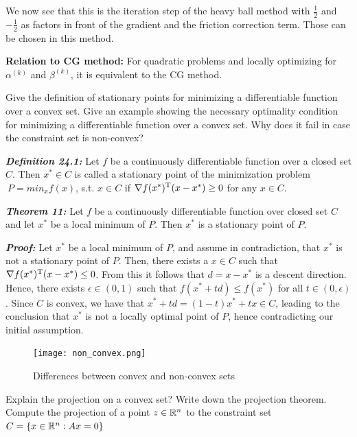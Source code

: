 \documentclass[12pt,a4paper]{article}
\begin{document}
We now see that this is the iteration step of the heavy ball method with $\frac{1}{2}$ and $-\frac{1}{2}$ as factors in front of the gradient and the friction correction term. Those can be chosen in this method.

\textbf{Relation to CG method:} For quadratic problems and locally optimizing for $\alpha^{(k)}$ and $\beta^{(k)}$, it is equivalent to the CG method.


\begin{question}
Give the definition of stationary points for minimizing a differentiable function over a convex set. Give an example showing the necessary optimality condition for minimizing a differentiable function over a convex set. Why does it fail in case the constraint set is non-convex?
\end{question}

\textbf{\textit{Definition 24.1:}} Let $f$ be a continuously differentiable function over a closed set $C$. Then $x^* \in C$ is called a stationary point of the minimization problem $\ P = min_x f(x)$, s.t. $x \in C$ if $ \nabla f(x^*)^{\mathrm{T}} (x - x^*) \geq 0$ for any $x \in C$.

\textbf{\textit{Theorem 11:}} Let $f$ be a continuously differentiable function over closed set $C$ and let $x^*$ be a local minimum of $P$. Then $x^*$ is a stationary point of $P$.

\textbf{\textit{Proof:}} Let $x^*$ be a local minimum of $P$, and assume in contradiction, that $x^*$ is not a stationary point of $P$. Then, there exists a $x \in C$ such that $\nabla f(x^*)^{\mathrm{T}} (x - x^*) \le 0$. From this it follows that $d = x - x^*$ is a descent direction. Hence, there exists $\epsilon \in (0,1)$ such that $f(x^* + td) \le f(x^*)$ for all $t \in (0,\epsilon)$. Since $C$ is convex, we have that $x^* +td = (1-t)x^* +tx \in C$, leading to the conclusion that $x^*$ is not a locally optimal point of $P$, hence contradicting our initial assumption.

\begin{figure}[H]
  \centering
  \texttt{[image: non\_convex.png]}
  \caption{Differences between convex and non-convex sets
  \label{fig:non-convex}}
\end{figure}

\begin{question}
  Explain the projection on a convex set? Write down the projection theorem. Compute the projection of a point $z \in \mathbb{R}^n$ to the constraint set $C = \{x \in \mathbb{R}^n:Ax=0\}$
\end{question}
\end{document}
